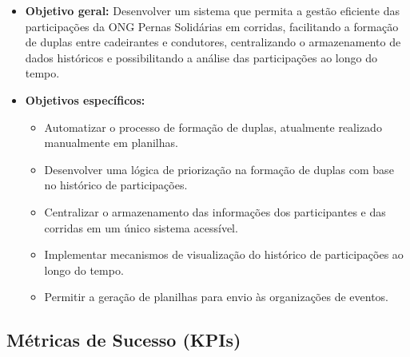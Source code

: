 \documentclass[12pt,a4paper]{article}
\begin{document}
\begin{itemize}
    \item \textbf{Objetivo geral:} Desenvolver um sistema que permita a gestão eficiente
    das participações da ONG Pernas Solidárias em corridas, facilitando a formação de
    duplas entre cadeirantes e condutores, centralizando o armazenamento de dados
    históricos e possibilitando a análise das participações ao longo do tempo.

    \item \textbf{Objetivos específicos:}
    \begin{itemize}
        \item Automatizar o processo de formação de duplas, atualmente realizado
        manualmente em planilhas.
        \item Desenvolver uma lógica de priorização na formação de duplas com base no
        histórico de participações.
        \item Centralizar o armazenamento das informações dos participantes e das corridas
        em um único sistema acessível.
        \item Implementar mecanismos de visualização do histórico de participações ao
        longo do tempo.
        \item Permitir a geração de planilhas para envio às organizações de eventos.
    \end{itemize}
\end{itemize}

\subsection{Métricas de Sucesso (KPIs)}
\end{document}
